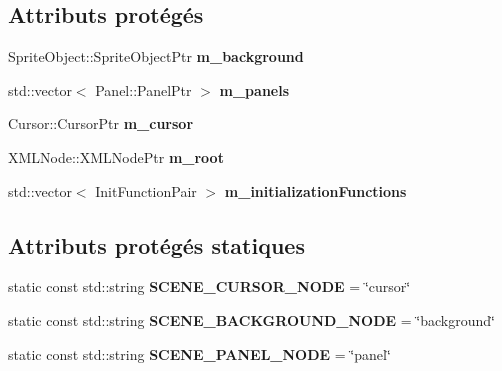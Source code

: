 \subsection*{Attributs protégés}
\begin{DoxyCompactItemize}
\item 
\mbox{\label{classmy_1_1MainMenu_a6353917fac209a9e2b373d0baf8e706d}} 
Sprite\+Object\+::\+Sprite\+Object\+Ptr {\bfseries m\+\_\+background}
\item 
\mbox{\label{classmy_1_1MainMenu_a7026ad1d5239747cafeb0311bd1be6c3}} 
std\+::vector$<$ Panel\+::\+Panel\+Ptr $>$ {\bfseries m\+\_\+panels}
\item 
\mbox{\label{classmy_1_1MainMenu_a7b4c388904d29dacaed752d24806af07}} 
Cursor\+::\+Cursor\+Ptr {\bfseries m\+\_\+cursor}
\item 
\mbox{\label{classmy_1_1MainMenu_a14fa5f4a1d39c3a395421d40ab5e70e1}} 
X\+M\+L\+Node\+::\+X\+M\+L\+Node\+Ptr {\bfseries m\+\_\+root}
\item 
\mbox{\label{classmy_1_1MainMenu_ac20c2eeca3ed98c03be2895ed97ffe2f}} 
std\+::vector$<$ Init\+Function\+Pair $>$ {\bfseries m\+\_\+initialization\+Functions}
\end{DoxyCompactItemize}
\subsection*{Attributs protégés statiques}
\begin{DoxyCompactItemize}
\item 
\mbox{\label{classmy_1_1MainMenu_a46b0174e3a1c0b4a1900c08a1466f6ee}} 
static const std\+::string {\bfseries S\+C\+E\+N\+E\+\_\+\+C\+U\+R\+S\+O\+R\+\_\+\+N\+O\+DE} = \char`\"{}cursor\char`\"{}
\item 
\mbox{\label{classmy_1_1MainMenu_a2b1bd6d21170cf4add1664de523477fd}} 
static const std\+::string {\bfseries S\+C\+E\+N\+E\+\_\+\+B\+A\+C\+K\+G\+R\+O\+U\+N\+D\+\_\+\+N\+O\+DE} = \char`\"{}background\char`\"{}
\item 
\mbox{\label{classmy_1_1MainMenu_aec125c05b5d2f5d5b93a994d1d44b15b}} 
static const std\+::string {\bfseries S\+C\+E\+N\+E\+\_\+\+P\+A\+N\+E\+L\+\_\+\+N\+O\+DE} = \char`\"{}panel\char`\"{}
\end{DoxyCompactItemize}
